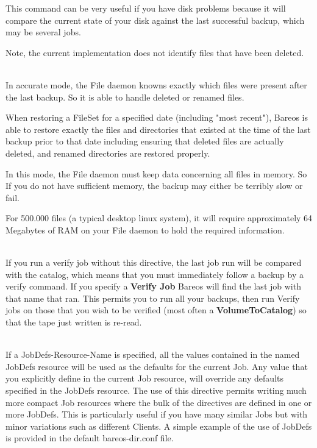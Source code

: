 \begin{description}
\begin{description}
This command can be very useful if you have disk problems because it
will compare the current state of your disk against the last successful
backup, which may be several jobs.

Note, the current implementation does not identify files that
have been deleted.
\end{description}

\item [Accurate = {\textless}yes{\textbar}no{\textgreater}] \hfill \\
In accurate mode, the File daemon knowns exactly which files were present
after the last backup. So it is able to handle deleted or renamed files.

When restoring a FileSet for a specified date (including "most
recent"), Bareos is able to restore exactly the files and
directories that existed at the time of the last backup prior to
that date including ensuring that deleted files are actually deleted,
and renamed directories are restored properly.

In this mode, the File daemon must keep data concerning all files in
memory.  So If you do not have sufficient memory, the backup may
either be terribly slow or fail.


For 500.000 files (a typical desktop linux system), it will require
approximately 64 Megabytes of RAM on your File daemon to hold the
required information.

\item [Verify Job = {\textless}Job-Resource-Name{\textgreater}] \hfill \\
If you run a verify job without this directive, the last job run will be
compared with the catalog, which means that you must immediately follow
a backup by a verify command.  If you specify a {\bf Verify Job} Bareos
will find the last job with that name that ran.  This permits you to run
all your backups, then run Verify jobs on those that you wish to be
verified (most often a {\bf VolumeToCatalog}) so that the tape just
written is re-read.

\item [JobDefs = {\textless}JobDefs-Resource-Name{\textgreater}] \hfill \\
If a JobDefs-Resource-Name is specified, all the values contained in the
named JobDefs resource will be used as the defaults for the current Job.
Any value that you explicitly define in the current Job resource, will
override any defaults specified in the JobDefs resource.  The use of
this directive permits writing much more compact Job resources where the
bulk of the directives are defined in one or more JobDefs.  This is
particularly useful if you have many similar Jobs but with minor
variations such as different Clients.  A simple example of the use of
JobDefs is provided in the default bareos-dir.conf file.


\end{description}
